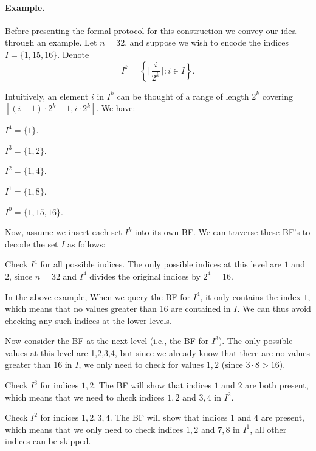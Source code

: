 

\paragraph{Example.} 
Before presenting the formal protocol for this construction we convey our idea through an example.  Let $n =
32$, and suppose we wish to encode the indices $I =  \{1, 15, 16\}$. 
Denote $$I^k = \left \{ \Big \lceil \frac i {2^k} \Big \rceil : i \in
I \right \}.$$

Intuitively, an element $i$ in $I^k$ can be thought of a range of length
$2^k$ covering $[(i-1)\cdot 2^{k}+1, i\cdot2^k]$. We have:
\BI
\item $I^4 = \{1\}.$
\item $I^3 = \{1, 2\}.$
\item $I^2 = \{1, 4\}.$
\item $I^1 = \{1, 8\}.$
\item $I^0 = \{1, 15, 16\}.$
\EI

Now, assume we insert each set $I^k$ into its own BF. We can traverse these BF's to decode the set $I$ as follows:

\BEN
\item Check $I^4$ for all possible indices. The only possible indices at this level are $1$ and $2$, since $n=32$ and $I^4$ divides the original indices by
$2^4 = 16$. 

In the above example, When we query the BF for $I^4$, it 
only contains the index $1$, which means that no values greater than 16 are contained in $I$.  We can thus avoid checking any such indices at the lower levels.  

Now consider the BF at the next level (i.e., the BF for $I^3$).  The
only possible values at this level are 1,2,3,4, but since we already
know that there are no values greater than 16 in $I$, we only need to
check for values $1, 2$ (since $3 \cdot 8 > 16$).

\item Check $I^3$ for indices $1, 2$. The BF will show that indices $1$ and $2$
are both present, which means that we need to check indices $1,2$ and $3,4$ in $I^2$. 
\item Check $I^2$ for indices $1, 2, 3, 4$. The BF will show that indices $1$ and $4$
are present, which means that we only need to check indices $1, 2$ and $7, 8$ in $I^1$, all other indices can be skipped.

